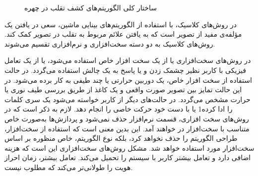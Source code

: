 \begin{figure}[ht]
\caption{ساختار کلی الگوریتم‌های کشف تقلب در چهره}
\label{fig:algs}
\end{figure}

در روش‌های کلاسیک، با استفاده از الگوریتم‌های بینایی ماشین، سعی در یافتن یک مؤلفه‌ی مفید از تصویر است که به یافتن علائم مربوط به تقلب در تصویر کمک کند. روش‌های کلاسیک به دو دسته سخت‌افزاری و نرم‌افزاری تقسیم می‌شوند.
\cite{ramachandra2017presentation}


در روش‌های سخت‌افزاری یا از یک سخت افزار خاص استفاده می‌شود، یا از یک تعامل فیزیکی با کاربر نظیر چشمک زدن و یا پاسخ به یک چالش استفاده می‌گردد.
در حالت استفاده از سخت افزار خاص، یک دوربین حرارتی یا چند طیفی به کار برده می‌شود. در این حالت تمایز بین تصویر صورت واقعی و یک کاغذ از طریق بررسی طیف نوری یا حرارت مشخص می‌گردد. در حالت‌های دیگر از کاربر خواسته می‌شود یک سری کلمات را ادا کرده1 یا با دست خود حرکت خاصی را انجام دهد.
لازم به ذکر است که در روش‌های سخت افزاری، قسمت نرم‌افزار حذف نمی‌شود و پردازش‌ها به‌صورت خاص متناسب با سخت‌افزار در خواهند آمد. این بدین معنی است که استفاده از سخت‌افزار، طراحی الگوریتم را حذف نخواهد کرد، بلکه نوع الگوریتم، خاص منظوره بر اساس سخت‌افزار مورد استفاده خواهد شد.
مشکل روش‌های سخت‌افزاری این است که هزینه اضافی دارد و تعامل بیشتر کاربر با سیستم را تحمیل می‌کند. تعامل بیشتر، زمان احراز هویت را طولانی‌تر می‌کند که مطلوب نیست.


